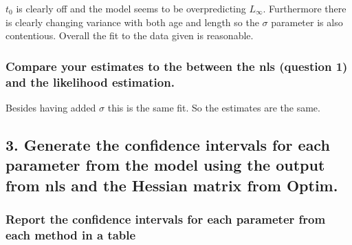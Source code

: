 \documentclass[
]{article}
\begin{document}
\(t_0\) is clearly off and the model seems to be overpredicting
\(L_{\infty}\). Furthermore there is clearly changing variance with both
age and length so the \(\sigma\) parameter is also contentious. Overall
the fit to the data given is reasonable.

\hypertarget{compare-your-estimates-to-the-between-the-nls-question-1-and-the-likelihood-estimation.}{%
\subsubsection{Compare your estimates to the between the nls (question
1) and the likelihood
estimation.}\label{compare-your-estimates-to-the-between-the-nls-question-1-and-the-likelihood-estimation.}}

Besides having added \(\sigma\) this is the same fit. So the estimates
are the same.

\hypertarget{generate-the-confidence-intervals-for-each-parameter-from-the-model-using-the-output-from-nls-and-the-hessian-matrix-from-optim.}{%
\subsection{3. Generate the confidence intervals for each parameter from
the model using the output from nls and the Hessian matrix from
Optim.}\label{generate-the-confidence-intervals-for-each-parameter-from-the-model-using-the-output-from-nls-and-the-hessian-matrix-from-optim.}}

\hypertarget{report-the-confidence-intervals-for-each-parameter-from-each-method-in-a-table}{%
\subsubsection{Report the confidence intervals for each parameter from
each method in a
table}\label{report-the-confidence-intervals-for-each-parameter-from-each-method-in-a-table}}
\end{document}
